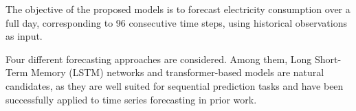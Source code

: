 




The objective of the proposed models is to forecast electricity consumption over a full day, corresponding to 96 consecutive time steps, using historical observations as input.

\par
Four different forecasting approaches are considered. Among them, Long Short-Term Memory (LSTM) networks and transformer-based models are natural candidates, as they are well suited for sequential prediction tasks and have been successfully applied to time series forecasting in prior work.

